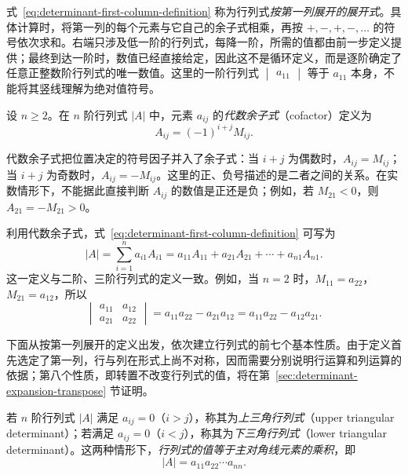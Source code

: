 式~\eqref{eq:determinant-first-column-definition} 称为行列式\emph{按第一列展开的展开式}。具体计算时，将第一列的每个元素与它自己的余子式相乘，再按 $+,-,+,-,\ldots$ 的符号依次求和。右端只涉及低一阶的行列式，每降一阶，所需的值都由前一步定义提供；最终到达一阶时，数值已经直接给定，因此这不是循环定义，而是逐阶确定了任意正整数阶行列式的唯一数值。这里的一阶行列式 $\begin{vmatrix}a_{11}\end{vmatrix}$ 等于 $a_{11}$ 本身，不能将其竖线理解为绝对值符号。

\begin{definition}
\label{def:determinant-cofactor}
设 $n\geq 2$。在 $n$ 阶行列式 $|A|$ 中，元素 $a_{ij}$ 的\emph{代数余子式}（cofactor）定义为
\[
    A_{ij}=(-1)^{i+j}M_{ij}.
\]
\end{definition}

代数余子式把位置决定的符号因子并入了余子式：当 $i+j$ 为偶数时，$A_{ij}=M_{ij}$；当 $i+j$ 为奇数时，$A_{ij}=-M_{ij}$。这里的正、负号描述的是二者之间的关系。在实数情形下，不能据此直接判断 $A_{ij}$ 的数值是正还是负；例如，若 $M_{21}<0$，则 $A_{21}=-M_{21}>0$。

利用代数余子式，式~\eqref{eq:determinant-first-column-definition} 可写为
\[
    |A|=\sum_{i=1}^{n}a_{i1}A_{i1}
    =a_{11}A_{11}+a_{21}A_{21}+\cdots+a_{n1}A_{n1}.
\]
这一定义与二阶、三阶行列式的定义一致。例如，当 $n=2$ 时，$M_{11}=a_{22}$，$M_{21}=a_{12}$，所以
\[
    \begin{vmatrix}
        a_{11} & a_{12} \\
        a_{21} & a_{22}
    \end{vmatrix}
    =a_{11}a_{22}-a_{21}a_{12}
    =a_{11}a_{22}-a_{12}a_{21}.
\]


下面从按第一列展开的定义出发，依次建立行列式的前七个基本性质。由于定义首先选定了第一列，行与列在形式上尚不对称，因而需要分别说明行运算和列运算的依据；第八个性质，即转置不改变行列式的值，将在第~\ref{sec:determinant-expansion-transpose} 节证明。

\begin{property}[三角行列式的值]
\label{prop:determinant-triangular}
若 $n$ 阶行列式 $|A|$ 满足 $a_{ij}=0$（$i>j$），称其为\emph{上三角行列式}（upper triangular determinant）；若满足 $a_{ij}=0$（$i<j$），称其为\emph{下三角行列式}（lower triangular determinant）。这两种情形下，\emph{行列式的值等于主对角线元素的乘积}，即
\[
    |A|=a_{11}a_{22}\cdots a_{nn}.
\]
\end{property}

